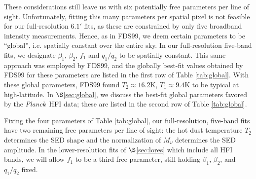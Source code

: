 \documentclass{emulateapj}
\newcommand{\PLANCK}{{\it Planck}}
\begin{document}

These considerations still leave us with six potentially free parameters per 
line of sight. Unfortunately, fitting this many parameters per spatial pixel is
not feasible for our full-resolution $6.1$$'$ fits, as these are constrained by
only five broadband intensity measurements. Hence, as in FDS99, we deem certain
 parameters to be ``global'', i.e. spatially constant over the entire sky. In 
our full-resolution five-band fits, we designate $\beta_1$, $\beta_2$, $f_1$ 
and $q_1/q_2$ to be spatially constant. This same approach was employed by 
FDS99, and the globally best-fit values obtained by FDS99 for these parameters 
are listed in the first row of Table \ref{tab:global}. With these global 
parameters, FDS99 found $T_2$$\approx$$16.2$K, $T_1$$\approx$$9.4$K to be 
typical at high-latitude. In $\S$\ref{sec:global}, we discuss the best-fit 
global parameters favored by the \PLANCK~HFI data; these are listed in the 
second row of Table \ref{tab:global}.

Fixing the four parameters of Table \ref{tab:global}, our full-resolution, 
five-band fits have two remaining free parameters per line of sight: the hot 
dust temperature $T_2$ determines the SED shape and the normalization of 
$M_{\nu}$ determines the SED amplitude. In the lower-resolution fits of 
$\S$\ref{sec:lores} which include all HFI bands, we will allow $f_1$ to be a 
third free parameter, still holding $\beta_1$, $\beta_2$, and $q_1/q_2$ fixed.


% 




\end{document}
